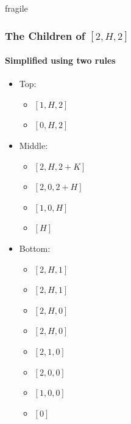 \documentclass[aspectratio=169,usenames,dvipsnames]{beamer}
\begin{document}
\begin{frame}{fragile}
    \frametitle{The Children of $[2, H, 2]$}
    \framesubtitle{Simplified using two rules}
    
    \begin{multicols}{2}
    \begin{itemize}
        \item Top:
        \begin{itemize}
            \item $[1, H, 2]$
            \item $[0, H, 2]$
        \end{itemize}
    \end{itemize}
    
    \begin{itemize}
        \item Middle:
        \begin{itemize}
            \item $[2, H, 2 + K]$
            \item \sout{$[2, 0, 2 + H]$}
            \item $[1, 0, H]$
            \item $[H]$
        \end{itemize}
    \end{itemize}
    
    \begin{itemize}
        \item Bottom:
        \begin{itemize}
            \item $[2, H, 1]$
            \item $[2, H, 1]$
            \item $[2, H, 0]$
            \item \sout{$[2, H, 0]$}
            \item $[2, 1, 0]$
            \item $[2, 0, 0]$
            \item $[1, 0, 0]$
            \item \sout{$[0]$}

        \end{itemize}
    \end{itemize}
    \end{multicols}
    
\end{frame}
\end{document}
